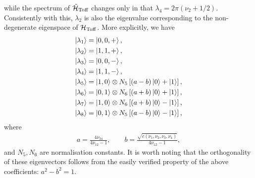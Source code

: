 while the spectrum of $\tilde{{\mathcal{H}}}_{\operatorname{Toff}}$ changes only in that
$\lambda_4 = 2\pi(\nu_2 + 1/2)$.
Consistently with this, $\lambda_2$ is also the eigenvalue corresponding to the non-degenerate eigenspace of ${\mathcal{H}}_{\operatorname{Toff}}$.
More explicitly, we have
\begin{equation}
\begin{aligned}
	\ket{\lambda_1} &= \ket{0, 0, +}, \\
	\ket{\lambda_2} &= \ket{1, 1, +}, \\
	\ket{\lambda_3} &= \ket{0, 0, -}, \\
	\ket{\lambda_4} &= \ket{1, 1, -}, \\
	\ket{\lambda_5} &= \ket{1, 0} \otimes N_5\left[(a - b) \ket0 + \ket1 \right], \\
	\ket{\lambda_6} &= \ket{0, 1} \otimes N_6\left[(a + b) \ket0 + \ket1 \right], \\
	\ket{\lambda_7} &= \ket{1, 0} \otimes N_6\left[(a + b) \ket0 - \ket1 \right], \\
	\ket{\lambda_8} &= \ket{0, 1} \otimes N_5\left[(a - b) \ket0 - \ket1 \right],
\end{aligned}
\label{eq:GL:toffoli_eigenvectors_solution}
\end{equation}
where
\begin{equation}
\begin{gathered}
	a = \frac{4\nu_{34}}{4\nu_{12}-1},
	\qquad
	b = \frac{\sqrt{c(\nu_1,\nu_2,\nu_3,\nu_4)}}{4\nu_{12}-1},
\end{gathered}
\end{equation}
and $N_5,N_6$ are normalisation constants.
It is worth noting that the orthogonality of these eigenvectors follows from the easily verified property of the above coefficients: $a^2 - b^2 = 1$.
